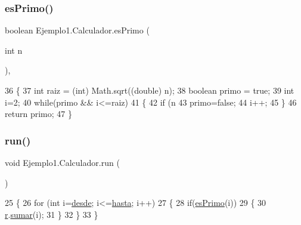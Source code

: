 \subsubsection{\texorpdfstring{es\+Primo()}{esPrimo()}}
{\footnotesize\ttfamily boolean Ejemplo1.\+Calculador.\+es\+Primo (\begin{DoxyParamCaption}\item[{int}]{n }\end{DoxyParamCaption})\hspace{0.3cm}{\ttfamily [inline]}, {\ttfamily [private]}}


\begin{DoxyCode}
36     \{
37         \textcolor{keywordtype}{int} raiz = (int) Math.sqrt((\textcolor{keywordtype}{double}) n);
38         \textcolor{keywordtype}{boolean} primo = \textcolor{keyword}{true};
39         \textcolor{keywordtype}{int} i=2;
40         \textcolor{keywordflow}{while}(primo && i<=raiz)
41         \{
42             \textcolor{keywordflow}{if} (n %
43                 primo=\textcolor{keyword}{false};
44             i++;
45         \}
46         \textcolor{keywordflow}{return} primo;
47     \}
\end{DoxyCode}
\mbox{\label{class_ejemplo1_1_1_calculador_ae4be53c009236802d18046f14b93d739}} 
\subsubsection{\texorpdfstring{run()}{run()}}
{\footnotesize\ttfamily void Ejemplo1.\+Calculador.\+run (\begin{DoxyParamCaption}{ }\end{DoxyParamCaption})\hspace{0.3cm}{\ttfamily [inline]}}


\begin{DoxyCode}
25     \{
26         \textcolor{keywordflow}{for} (\textcolor{keywordtype}{int} i=\mbox{\hyperlink{class_ejemplo1_1_1_calculador_ae2bd37cb102b858db503e8b30c8f4ae6}{desde}}; i<=\mbox{\hyperlink{class_ejemplo1_1_1_calculador_ad47ad2af292db2c559a379ecc3e15f73}{hasta}}; i++)
27         \{
28             \textcolor{keywordflow}{if}(\mbox{\hyperlink{class_ejemplo1_1_1_calculador_ad9ecfddfb2d7350e2b30ff9bdc4cc97d}{esPrimo}}(i))
29             \{
30                 \mbox{\hyperlink{class_ejemplo1_1_1_calculador_a630ab3c94b10e8ca0483b6ca6a6dc380}{r}}.\mbox{\hyperlink{class_ejemplo1_1_1_resultado_a2a8879e3a5c2d5e25191ec99fabe45e6}{sumar}}(i);
31             \}
32         \}
33     \}
\end{DoxyCode}


